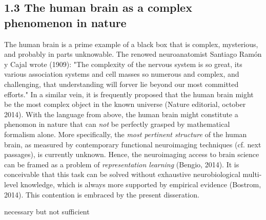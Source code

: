 \documentclass[authoryear,review,3p]{elsarticle}
\begin{document}
\subsection*{1.3 The human brain as a complex phenomenon in nature}
The human brain is a prime example of
a black box that is complex, mysterious, and probably in parts unknowable.
The renowed neuroanatomist Santiago Ram\'{o}n y Cajal wrote (1909):
"The complexity of the nervous system is so great,
its various association systems and cell masses so numerous and
complex, and challenging,
that understanding will forver lie beyond our most committed efforts."
In a similar vein,
it is frequently proposed that
the human brain might be the most complex object in the known universe
(Nature editorial, october 2014).
With the language from above,
the human brain might constitute a phenomon in nature that
can \textit{not} be perfectly grasped by mathematical formalism alone.
More specifically,
the \textit{most pertinent structure} of the human brain,
as measured by
contemporary functional neuroimaging techniques (cf. next passages),
is currently unknown.
Hence, the neuroimaging access to brain science can be framed as
a problem of \textit{representation learning} (Bengio, 2014).
It is conceivable
that this task can be solved without exhaustive
neurobiological multi-level knowledge,
which is always more supported by empirical evidence
(Bostrom, 2014).
This contention is embraced by the present disseration.



necessary but not sufficient
\end{document}
